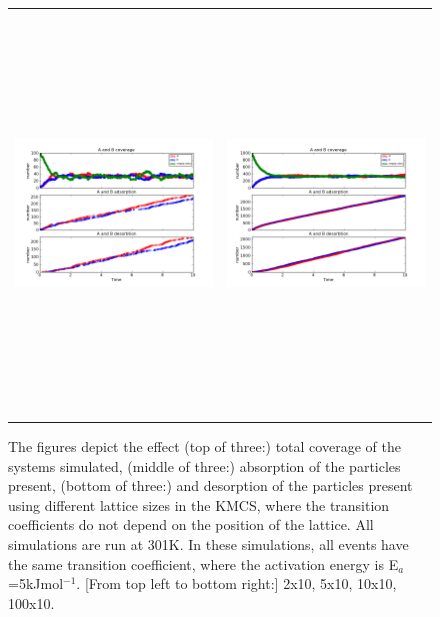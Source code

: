 \documentclass[11pt]{article}
\begin{document}
\begin{figure}[h!]
\begin{tabular}{cc}
\includegraphics[width=3.5in, height=4.2in]{./coadsorb/AtoBcoadsorb10x10_301_allsamek__A5_EA5E3_1.png} &
\includegraphics[width=3.5in, height=4.2in]{./coadsorb/AtoBcoadsorb100x10_301_allsamek__A5_EA5E3_1.png} 
\end{tabular}
\caption{The figures depict the effect (top of three:) total coverage of the systems simulated, (middle of three:) absorption of the particles present, (bottom of three:) and desorption of the particles present using different lattice sizes in the KMCS, where the transition coefficients do not depend on the position of the lattice. All simulations are run at 301K. In these simulations, all events have the same transition coefficient, where the activation energy is E$_a$=5kJmol$^{-1}$. [From top left to bottom right:] 2x10, 5x10, 10x10, 100x10. }
\end{figure}
\end{document}
